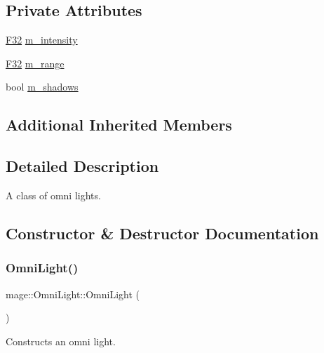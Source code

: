\subsection*{Private Attributes}
\begin{DoxyCompactItemize}
\item 
\hyperlink{namespacemage_aa97e833b45f06d60a0a9c4fc22ae02c0}{F32} \hyperlink{classmage_1_1_omni_light_aa0cbdebabf3ce0d8bbaeff7cf88cadd0}{m\+\_\+intensity}
\item 
\hyperlink{namespacemage_aa97e833b45f06d60a0a9c4fc22ae02c0}{F32} \hyperlink{classmage_1_1_omni_light_a0427a9c7f90750c645cd67ef0bafce47}{m\+\_\+range}
\item 
bool \hyperlink{classmage_1_1_omni_light_a63e5dab12be5021815e98c81dd9aed6a}{m\+\_\+shadows}
\end{DoxyCompactItemize}
\subsection*{Additional Inherited Members}


\subsection{Detailed Description}
A class of omni lights. 

\subsection{Constructor \& Destructor Documentation}
\hypertarget{classmage_1_1_omni_light_a993394b31cdddcf37018cd5ff09d2d99}{}\label{classmage_1_1_omni_light_a993394b31cdddcf37018cd5ff09d2d99} 
\subsubsection{\texorpdfstring{Omni\+Light()}{OmniLight()}\hspace{0.1cm}{\footnotesize\ttfamily [1/3]}}
{\footnotesize\ttfamily mage\+::\+Omni\+Light\+::\+Omni\+Light (\begin{DoxyParamCaption}{ }\end{DoxyParamCaption})}

Constructs an omni light. \hypertarget{classmage_1_1_omni_light_accf10bcdf8ed523cfb04129f5345ef92}{}\label{classmage_1_1_omni_light_accf10bcdf8ed523cfb04129f5345ef92} 
